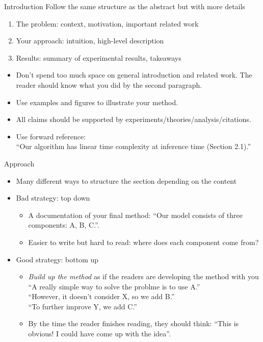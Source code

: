 \documentclass[usenames,dvipsnames,notes]{beamer}
\begin{document}
\begin{frame}
    {Introduction}
    Follow the same structure as the abstract but with more details\\
    \begin{enumerate}
        \item The problem: context, motivation, important related work 
        \item Your approach: intuition, high-level description
        \item Results: summary of experimental results, takeaways
    \end{enumerate}
    \begin{itemize}
        \item Don't spend too much space on general introduction and related work. The reader should know what you did by the second paragraph.
        \item Use examples and figures to illustrate your method.
        \item All claims should be supported by experiments/theories/analysis/citations.
        \item Use forward reference:\\
            ``Our algorithm has linear time complexity at inference time (Section 2.1).''
    \end{itemize}
\end{frame}

\begin{frame}
    {Approach}
    \begin{itemize}
        \item Many different ways to structure the section depending on the content 
        \item Bad strategy: top down
            \begin{itemize}
                \item A documentation of your final method: ``Our model consists of three components: A, B, C.''.
                \item Easier to write but hard to read: where does each component come from?
            \end{itemize}
        \item Good strategy: bottom up
            \begin{itemize}
                \item \emph{Build up the method} as if the readers are developing the method with you\\
                    ``A really simple way to solve the problme is to use A.''\\
                    ``However, it doesn't consider X, so we add B.''\\
                    ``To further improve Y, we add C.''
                \item By the time the reader finishes reading, they should think: ``This is obvious! I could have come up with the idea''.
            \end{itemize}
    \end{itemize}
\end{frame}
\end{document}
